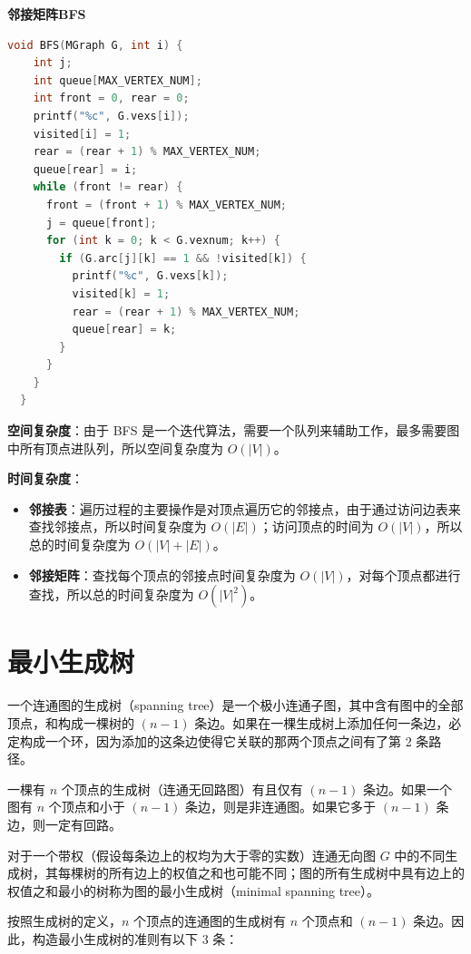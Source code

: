 \documentclass[lang=cn,newtx,10pt,scheme=chinese]{elegantbook}
\begin{document}
\textbf{邻接矩阵BFS}

\begin{lstlisting}[language=C++, caption={邻接矩阵BFS}]
  void BFS(MGraph G, int i) {
    int j;
    int queue[MAX_VERTEX_NUM];
    int front = 0, rear = 0;
    printf("%c", G.vexs[i]);
    visited[i] = 1;
    rear = (rear + 1) % MAX_VERTEX_NUM;
    queue[rear] = i;
    while (front != rear) {
      front = (front + 1) % MAX_VERTEX_NUM;
      j = queue[front];
      for (int k = 0; k < G.vexnum; k++) {
        if (G.arc[j][k] == 1 && !visited[k]) {
          printf("%c", G.vexs[k]);
          visited[k] = 1;
          rear = (rear + 1) % MAX_VERTEX_NUM;
          queue[rear] = k;
        }
      }
    }
  }
\end{lstlisting}

\textbf{空间复杂度}：由于 BFS 是一个迭代算法，需要一个队列来辅助工作，最多需要图中所有顶点进队列，所以空间复杂度为 $O(|V|)$。

\textbf{时间复杂度}：

\begin{itemize}
  \item \textbf{邻接表}：遍历过程的主要操作是对顶点遍历它的邻接点，由于通过访问边表来查找邻接点，所以时间复杂度为 $O(|E|)$；访问顶点的时间为 $O(|V|)$，所以总的时间复杂度为 $O(|V| + |E|)$。
  \item \textbf{邻接矩阵}：查找每个顶点的邻接点时间复杂度为 $O(|V|)$，对每个顶点都进行查找，所以总的时间复杂度为 $O(|V|^2)$。
  \end{itemize}

\section{最小生成树}
一个连通图的生成树（spanning tree）是一个极小连通子图，其中含有图中的全部顶点，和构成一棵树的 $(n-1)$ 条边。如果在一棵生成树上添加任何一条边，必定构成一个环，因为添加的这条边使得它关联的那两个顶点之间有了第 2 条路径。

一棵有 $n$ 个顶点的生成树（连通无回路图）有且仅有 $(n-1)$ 条边。如果一个图有 $n$ 个顶点和小于 $(n-1)$ 条边，则是非连通图。如果它多于 $(n-1)$ 条边，则一定有回路。

对于一个带权（假设每条边上的权均为大于零的实数）连通无向图 $G$ 中的不同生成树，其每棵树的所有边上的权值之和也可能不同；图的所有生成树中具有边上的权值之和最小的树称为图的最小生成树（minimal spanning tree）。

按照生成树的定义，$n$ 个顶点的连通图的生成树有 $n$ 个顶点和 $(n-1)$ 条边。因此，构造最小生成树的准则有以下 3 条：
\end{document}

